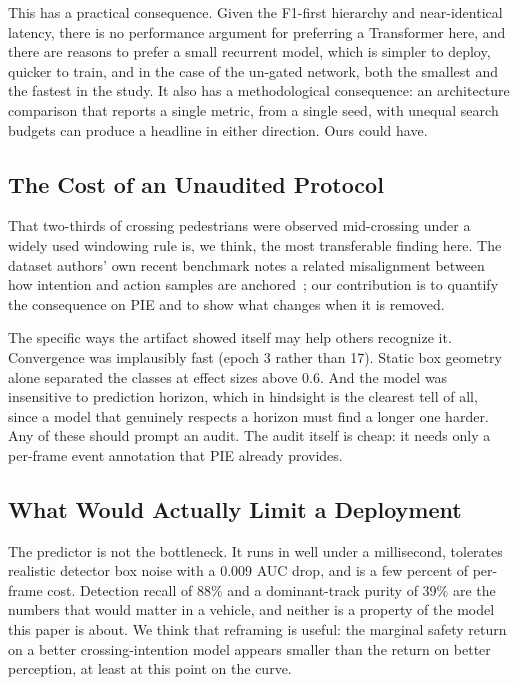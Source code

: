 \documentclass[mti,article,submit,moreauthors]{Definitions/mdpi}
\begin{document}
This has a practical consequence. Given the F1-first hierarchy and near-identical latency, there is no performance argument for preferring a Transformer here, and there are reasons to prefer a small recurrent model, which is simpler to deploy, quicker to train, and in the case of the un-gated network, both the smallest and the fastest in the study. It also has a methodological consequence: an architecture comparison that reports a single metric, from a single seed, with unequal search budgets can produce a headline in either direction. Ours could have.

\subsection{The Cost of an Unaudited Protocol}

That two-thirds of crossing pedestrians were observed mid-crossing under a widely used windowing rule is, we think, the most transferable finding here. The dataset authors' own recent benchmark notes a related misalignment between how intention and action samples are anchored~\citep{rasouli2024diving}; our contribution is to quantify the consequence on PIE and to show what changes when it is removed.

The specific ways the artifact showed itself may help others recognize it. Convergence was implausibly fast (epoch 3 rather than 17). Static box geometry alone separated the classes at effect sizes above 0.6. And the model was insensitive to prediction horizon, which in hindsight is the clearest tell of all, since a model that genuinely respects a horizon must find a longer one harder. Any of these should prompt an audit. The audit itself is cheap: it needs only a per-frame event annotation that PIE already provides.

\subsection{What Would Actually Limit a Deployment}

The predictor is not the bottleneck. It runs in well under a millisecond, tolerates realistic detector box noise with a 0.009 AUC drop, and is a few percent of per-frame cost. Detection recall of 88\% and a dominant-track purity of 39\% are the numbers that would matter in a vehicle, and neither is a property of the model this paper is about. We think that reframing is useful: the marginal safety return on a better crossing-intention model appears smaller than the return on better perception, at least at this point on the curve.
\end{document}
